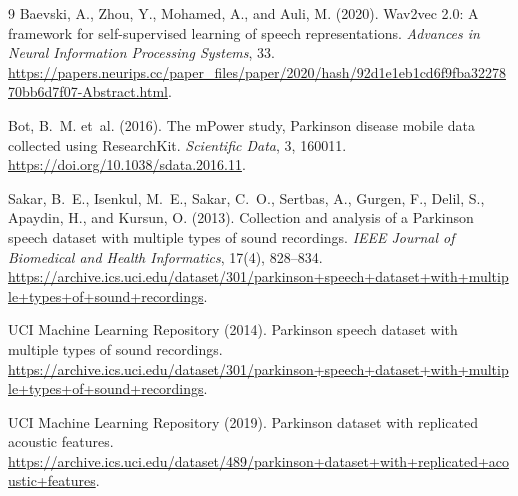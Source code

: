 \documentclass{article}
\begin{document}
\begin{thebibliography}{9}
Baevski, A., Zhou, Y., Mohamed, A., and Auli, M. (2020).
Wav2vec 2.0: A framework for self-supervised learning of speech representations.
\emph{Advances in Neural Information Processing Systems}, 33.
\url{https://papers.neurips.cc/paper_files/paper/2020/hash/92d1e1eb1cd6f9fba3227870bb6d7f07-Abstract.html}.

Bot, B.~M. et~al. (2016).
The mPower study, Parkinson disease mobile data collected using ResearchKit.
\emph{Scientific Data}, 3, 160011.
\url{https://doi.org/10.1038/sdata.2016.11}.

Sakar, B.~E., Isenkul, M.~E., Sakar, C.~O., Sertbas, A., Gurgen, F., Delil, S., Apaydin, H., and Kursun, O. (2013).
Collection and analysis of a Parkinson speech dataset with multiple types of sound recordings.
\emph{IEEE Journal of Biomedical and Health Informatics}, 17(4), 828--834.
\url{https://archive.ics.uci.edu/dataset/301/parkinson+speech+dataset+with+multiple+types+of+sound+recordings}.

UCI Machine Learning Repository (2014).
Parkinson speech dataset with multiple types of sound recordings.
\url{https://archive.ics.uci.edu/dataset/301/parkinson+speech+dataset+with+multiple+types+of+sound+recordings}.

UCI Machine Learning Repository (2019).
Parkinson dataset with replicated acoustic features.
\url{https://archive.ics.uci.edu/dataset/489/parkinson+dataset+with+replicated+acoustic+features}.
\end{thebibliography}
\end{document}

